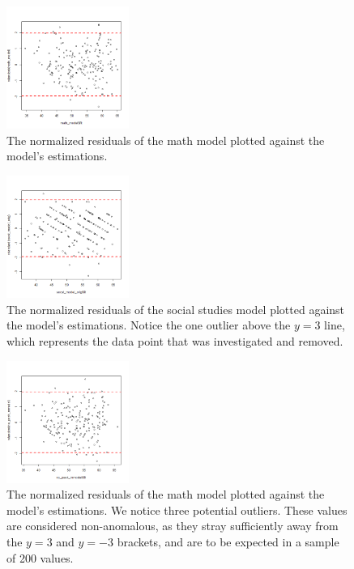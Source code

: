 \documentclass[10pt, a4paper]{article}
\begin{document}
	 \begin{figure}
	 	\includegraphics[width=4cm]{lm_math_residual_plot.png}
	 	\centering
	 	\caption{The normalized residuals of the math model plotted against the model's estimations.}
	 	\label{fig::lm_math_plot}
	 \end{figure}
 
	 \begin{figure}
	 	\includegraphics[width=4cm]{lm_socst_residual_plot.png}
	 	\centering
	 	\caption{The normalized residuals of the social studies model plotted against the model's estimations. Notice the one outlier above the $y=3$ line, which represents the data point that was investigated and removed.}
	 	\label{fig::lm_socst_plot}
	 \end{figure}
 
	 \begin{figure}
	 	\includegraphics[width=4cm]{lm_math_nopeeking_residual_plot.png}
	 	\centering
	 	\caption{The normalized residuals of the math model plotted against the model's estimations. We notice three potential outliers. These values are considered non-anomalous, as they stray sufficiently away from the $y=3$ and $y=-3$ brackets, and are to be expected in a sample of 200 values.}
	 	\label{fig::lm_math_nopeeking_plot}
	 \end{figure}
 
\end{document}

